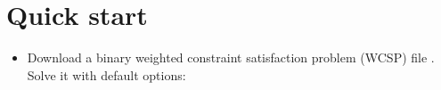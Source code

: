\documentclass[letterpaper,10pt,openany,oneside,english]{sphinxmanual}
\begin{document}
\section{Quick start}
\label{\detokenize{userdoc:quick-start}}\begin{itemize}
\item {} 
\sphinxAtStartPar
Download a binary weighted constraint satisfaction problem (WCSP) file . Solve it with default options:

\begin{sphinxVerbatim}[commandchars=\\\{\}]
 
\end{sphinxVerbatim}


\end{itemize}
\end{document}
